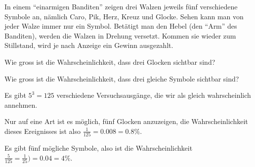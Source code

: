 In einem ``einarmigen Banditen'' zeigen drei Walzen jeweils fünf
verschiedene Symbole an, nämlich Caro, Pik, Herz, Kreuz und Glocke.
Sehen kann man von jeder Walze immer nur ein Symbol.
Betätigt man den Hebel (den ``Arm'' des Banditen),
werden die Walzen in Drehung versetzt. Kommen sie wieder zum Stillstand,
wird je nach Anzeige ein Gewinn ausgezahlt.
\begin{teilaufgaben}
\item
Wie gross ist die Wahrscheinlichkeit, dass drei Glocken sichtbar sind?
\item
Wie gross ist die Wahrscheinlichkeit, dass drei gleiche Symbole
sichtbar sind?
\end{teilaufgaben}


\begin{loesung}
Es gibt $5^3=125$ verschiedene Versuchsausgänge, die wir als gleich
wahrscheinlich annehmen.
\begin{teilaufgaben}
\item Nur auf eine Art ist es möglich, fünf Glocken anzuzeigen, die
Wahrscheinlichkeit dieses Ereignisses ist also $\frac1{125}=0.008=0.8\%$.
\item Es gibt fünf mögliche Symbole, also ist die Wahrscheinlichkeit
$\frac{5}{125}=\frac1{25})=0.04=4\%$.
\qedhere
\end{teilaufgaben}
\end{loesung}

